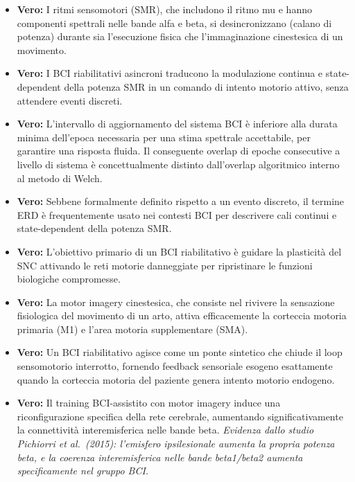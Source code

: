 \begin{itemize}
    \item \textbf{Vero:} I ritmi sensomotori (SMR), che includono il ritmo mu e hanno componenti spettrali nelle bande alfa e beta, si desincronizzano (calano di potenza) durante sia l'esecuzione fisica che l'immaginazione cinestesica di un movimento.
    
    \item \textbf{Vero:} I BCI riabilitativi asincroni traducono la modulazione continua e state-dependent della potenza SMR in un comando di intento motorio attivo, senza attendere eventi discreti.
    
    \item \textbf{Vero:} L'intervallo di aggiornamento del sistema BCI è inferiore alla durata minima dell'epoca necessaria per una stima spettrale accettabile, per garantire una risposta fluida. Il conseguente overlap di epoche consecutive a livello di sistema è concettualmente distinto dall'overlap algoritmico interno al metodo di Welch.
    
    \item \textbf{Vero:} Sebbene formalmente definito rispetto a un evento discreto, il termine ERD è frequentemente usato nei contesti BCI per descrivere cali continui e state-dependent della potenza SMR.
    
    \item \textbf{Vero:} L'obiettivo primario di un BCI riabilitativo è guidare la plasticità del SNC attivando le reti motorie danneggiate per ripristinare le funzioni biologiche compromesse.
    
    \item \textbf{Vero:} La motor imagery cinestesica, che consiste nel rivivere la sensazione fisiologica del movimento di un arto, attiva efficacemente la corteccia motoria primaria (M1) e l'area motoria supplementare (SMA).
    
    \item \textbf{Vero:} Un BCI riabilitativo agisce come un ponte sintetico che chiude il loop sensomotorio interrotto, fornendo feedback sensoriale esogeno esattamente quando la corteccia motoria del paziente genera intento motorio endogeno.
    
    \item \textbf{Vero:} Il training BCI-assistito con motor imagery induce una riconfigurazione specifica della rete cerebrale, aumentando significativamente la connettività interemisferica nelle bande beta.
    \textit{Evidenza dallo studio Pichiorri et al.\ (2015): l'emisfero ipsilesionale aumenta la propria potenza beta, e la coerenza interemisferica nelle bande beta1/beta2 aumenta specificamente nel gruppo BCI.}
\end{itemize}

